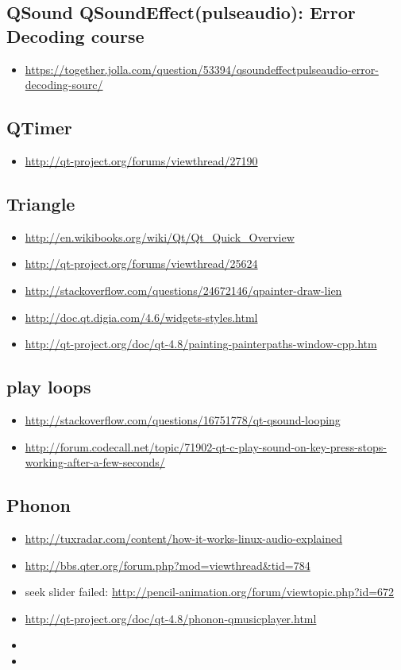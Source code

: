 \documentclass[9pt,b5paper]{article}
\begin{document}
\subsection{QSound QSoundEffect(pulseaudio): Error Decoding course}
\label{sec-17-17}
\begin{itemize}
\item \url{https://together.jolla.com/question/53394/qsoundeffectpulseaudio-error-decoding-sourc/}
\end{itemize}
\subsection{QTimer}
\label{sec-17-18}
\begin{itemize}
\item \url{http://qt-project.org/forums/viewthread/27190}
\end{itemize}
\subsection{Triangle}
\label{sec-17-19}
\begin{itemize}
\item \url{http://en.wikibooks.org/wiki/Qt/Qt_Quick_Overview}
\item \url{http://qt-project.org/forums/viewthread/25624}
\item \url{http://stackoverflow.com/questions/24672146/qpainter-draw-lien}
\item \url{http://doc.qt.digia.com/4.6/widgets-styles.html}
\item \url{http://qt-project.org/doc/qt-4.8/painting-painterpaths-window-cpp.htm}
\end{itemize}
\subsection{play loops}
\label{sec-17-20}
\begin{itemize}
\item \url{http://stackoverflow.com/questions/16751778/qt-qsound-looping}
\item \url{http://forum.codecall.net/topic/71902-qt-c-play-sound-on-key-press-stops-working-after-a-few-seconds/}
\end{itemize}
\subsection{Phonon}
\label{sec-17-21}
\begin{itemize}
\item \url{http://tuxradar.com/content/how-it-works-linux-audio-explained}
\item \url{http://bbs.qter.org/forum.php?mod=viewthread&tid=784}
\item seek slider failed: \url{http://pencil-animation.org/forum/viewtopic.php?id=672}
\item \url{http://qt-project.org/doc/qt-4.8/phonon-qmusicplayer.html}
\item 
\item 
\end{itemize}
\end{document}
